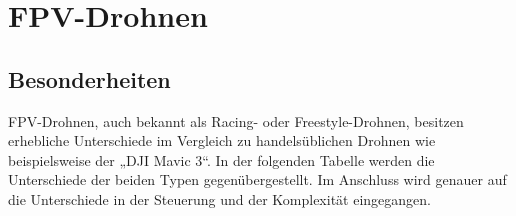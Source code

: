 
\section[FPV-Drohnen]{FPV-Drohnen}
    \subsection[Besonderheiten]{Besonderheiten}
        FPV-Drohnen, auch bekannt als Racing- oder Freestyle-Drohnen, besitzen erhebliche Unterschiede im Vergleich zu handelsüblichen Drohnen wie beispielsweise der „DJI Mavic 3“. In der folgenden Tabelle werden die Unterschiede der beiden Typen gegenübergestellt. Im Anschluss wird genauer auf die Unterschiede in der Steuerung und der Komplexität eingegangen.

